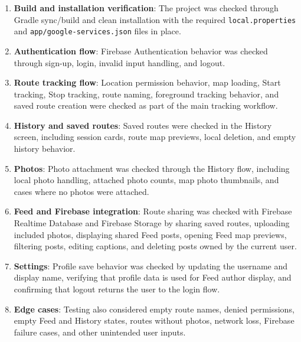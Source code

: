 \documentclass{article}
\begin{document}
                    \begin{enumerate}
                        \item \textbf{Build and installation verification}: The project was checked
                        through Gradle sync/build and clean installation with the required
                        \texttt{local.properties} and \texttt{app/google-services.json} files in place.

                        \item \textbf{Authentication flow}: Firebase Authentication behavior was
                        checked through sign-up, login, invalid input handling, and logout.

                        \item \textbf{Route tracking flow}: Location permission behavior, map loading,
                        Start tracking, Stop tracking, route naming, foreground tracking behavior, and
                        saved route creation were checked as part of the main tracking workflow.

                        \item \textbf{History and saved routes}: Saved routes were checked in the
                        History screen, including session cards, route map previews, local deletion,
                        and empty history behavior.

                        \item \textbf{Photos}: Photo attachment was checked through the History flow,
                        including local photo handling, attached photo counts, map photo thumbnails,
                        and cases where no photos were attached.

                        \item \textbf{Feed and Firebase integration}: Route sharing was checked with
                        Firebase Realtime Database and Firebase Storage by sharing saved routes,
                        uploading included photos, displaying shared Feed posts, opening Feed map
                        previews, filtering posts, editing captions, and deleting posts owned by the
                        current user.

                        \item \textbf{Settings}: Profile save behavior was checked by updating the
                        username and display name, verifying that profile data is used for Feed author
                        display, and confirming that logout returns the user to the login flow.

                        \item \textbf{Edge cases}: Testing also considered empty route names, denied
                        permissions, empty Feed and History states, routes without photos, network
                        loss, Firebase failure cases, and other unintended user inputs.
                    \end{enumerate}
\end{document}
